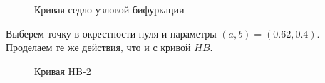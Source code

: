 \documentclass[12pt, a4paper]{article}
\begin{document}
\begin{figure}[H]
	\caption{Кривая седло-узловой бифуркации}
\end{figure}

Выберем точку в окрестности нуля и параметры $(a, b) = (0.62, 0.4)$. Проделаем те же действия, что и с кривой $HB$.

\begin{figure}[H]
	\caption{Кривая HB-2}
\end{figure}
\end{document}
